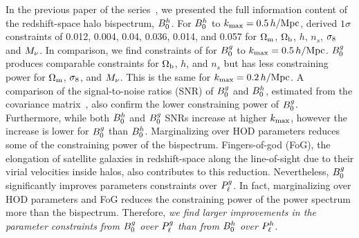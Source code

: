 
In the previous paper of the series~\citep{hahn2020}, we presented the full
information content of the redshift-space halo bispectrum, $B^h_0$. For $B^h_0$ to
$k_{\rm max}=0.5\,h/\mathrm{Mpc}$, \cite{hahn2020} derived $1\sigma$ constraints of 0.012, 0.004,
0.04, 0.036, 0.014, and 0.057 for $\Omega_{\rm m}$, $\Omega_{\rm b}$, $h$, $n_s$, $\sigma_8$ and $M_\nu$. 
In comparison, we find constraints of  for $B^g_0$ to
$k_{\rm max}=0.5\,h/\mathrm{Mpc}$. $B^g_0$ produces comparable constraints for $\Omega_{\rm b}$, $h$, and
$n_s$ but has less constraining power for $\Omega_{\rm m}$, $\sigma_8$, and $M_\nu$. This is
the same for $k_{\rm max}=0.2\,h/\mathrm{Mpc}$. A comparison of the signal-to-noise ratios (SNR)
of $B^g_0$ and $B^h_0$, estimated from the covariance
matrix~\citep[\eg][]{sefusatti2005,sefusatti2006,chan2017}, also confirm the lower
constraining power of $B^g_0$. Furthermore, while both $B^h_0$ and $B^g_0$ SNRs increase 
at higher $k_{\rm max}$, however the increase is lower for $B^g_0$ than $B^h_0$.
Marginalizing over HOD parameters reduces some of the constraining power of 
the bispectrum. Fingers-of-god (FoG), the elongation of satellite galaxies
in redshift-space along the line-of-sight due to their virial velocities inside 
halos, also contributes to this reduction. 
Nevertheless, $B^g_0$ significantly improves parameters constraints over $P^g_{\ell}$.
In fact, marginalizing over HOD parameters and FoG reduces the constraining
power of the power spectrum more than the bispectrum. Therefore, {\em we find 
larger improvements in the parameter constraints from $B^g_0$ over $P^g_{\ell}$ than
from $B^h_0$ over $P^h_{\ell}$}.

